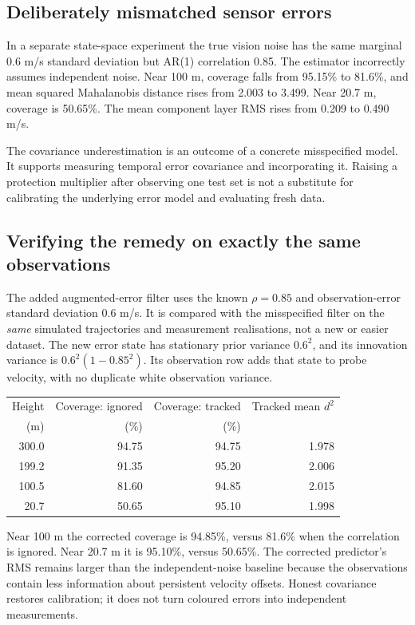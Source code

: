 \documentclass[11pt,a4paper]{article}
\numberwithin{equation}{section}
\begin{document}
\subsection{Deliberately mismatched sensor errors}
In a separate state-space experiment the true vision noise has the same marginal 0.6 m/s standard deviation but AR(1) correlation 0.85. The estimator incorrectly assumes independent noise. Near 100 m, coverage falls from 95.15\% to 81.6\%, and mean squared Mahalanobis distance rises from 2.003 to 3.499. Near 20.7 m, coverage is 50.65\%. The mean component layer RMS rises from 0.209 to 0.490 m/s.

The covariance underestimation is an outcome of a concrete misspecified model. It supports measuring temporal error covariance and incorporating it. Raising a protection multiplier after observing one test set is not a substitute for calibrating the underlying error model and evaluating fresh data.

\subsection{Verifying the remedy on exactly the same observations}
The added augmented-error filter uses the known $\rho=0.85$ and observation-error standard deviation 0.6 m/s. It is compared with the misspecified filter on the \emph{same} simulated trajectories and measurement realisations, not a new or easier dataset. The new error state has stationary prior variance $0.6^2$, and its innovation variance is $0.6^2(1-0.85^2)$. Its observation row adds that state to probe velocity, with no duplicate white observation variance.
\begin{center}
\begin{tabular}{rrrr}
\toprule
Height & Coverage: ignored & Coverage: tracked & Tracked mean $d^2$\\
(m) & (\%) & (\%) & \\
\midrule
300.0 & 94.75 & 94.75 & 1.978\\
199.2 & 91.35 & 95.20 & 2.006\\
100.5 & 81.60 & 94.85 & 2.015\\
20.7 & 50.65 & 95.10 & 1.998\\
\bottomrule
\end{tabular}
\end{center}
Near 100 m the corrected coverage is 94.85\%, versus 81.6\% when the correlation is ignored. Near 20.7 m it is 95.10\%, versus 50.65\%. The corrected predictor's RMS remains larger than the independent-noise baseline because the observations contain less information about persistent velocity offsets. Honest covariance restores calibration; it does not turn coloured errors into independent measurements.
\end{document}
